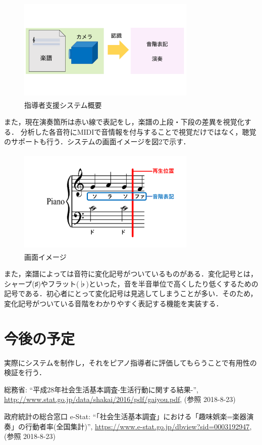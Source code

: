 \documentclass[twocolumn,10pt,a4j]{jsarticle}
\begin{document}
\begin{figure}[h]
\begin{center}
 \includegraphics[clip,width=85mm,height=50mm]{image1.pdf}
\end{center}
 \caption{指導者支援システム概要}
 \label{fig:教科書}
\end{figure}

また，現在演奏箇所は赤い線で表記をし，楽譜の上段・下段の差異を視覚化する．
分析した各音符にMIDIで音情報を付与することで視覚だけではなく，聴覚のサポートも行う．システムの画面イメージを図2で示す．

\begin{figure}[h]
\begin{center}
 \includegraphics[clip,width=85mm,height=50mm]{image2.pdf}
\end{center}
 \caption{画面イメージ}
 \label{fig:教科書}
\end{figure}

また，楽譜によっては音符に変化記号がついているものがある．変化記号とは，シャープ(♯)やフラット(♭)といった，音を半音単位で高くしたり低くするための記号である．初心者にとって変化記号は見逃してしまうことが多い．そのため，変化記号がついている音階をわかりやすく表記する機能を実装する．

\section{今後の予定}
実際にシステムを制作し，それをピアノ指導者に評価してもらうことで有用性の検証を行う．

\begin{thebibliography}{99}
 総務省: ``平成28年社会生活基本調査-生活行動に関する結果-'', \url{http://www.stat.go.jp/data/shakai/2016/pdf/gaiyou.pdf}, (参照 2018-8-23)

 政府統計の総合窓口 e-Stat: ``「社会生活基本調査」における「趣味娯楽=楽器演奏」の行動者率(全国集計)'', \url{https://www.e-stat.go.jp/dbview?sid=0003192947}, (参照 2018-8-23)

\end{thebibliography}
\end{document}
